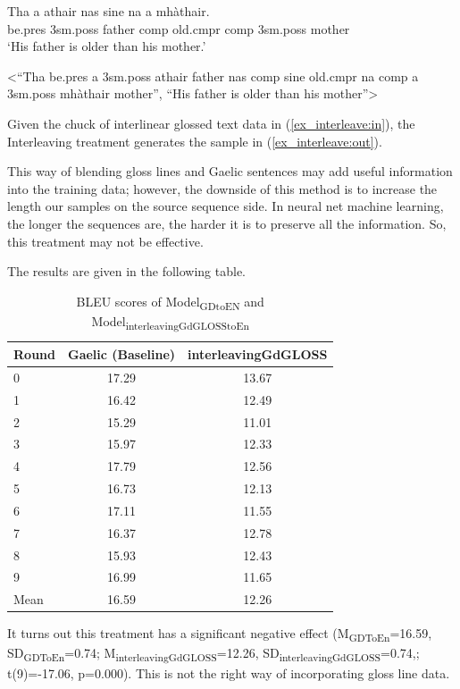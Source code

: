 \documentclass[final]{ua-thesis}
\numberwithin{equation}{section}
\begin{document}
\begin{exe} 
\ex 
	\begin{xlist}
	\ex \label{ex_interleave:in}
		\gll	 Tha a athair nas sine na a mh\`athair.\\  
     		     be.pres 3sm.poss father comp old.cmpr comp 3sm.poss mother \\
    	\glt    `His father is older than his mother.'  

    \ex \label{ex_interleave:out} <``Tha be.pres a 3sm.poss athair father nas comp sine old.cmpr na comp a 3sm.poss mh\`athair mother'', ``His father is older than his mother''>
    \end{xlist}
\end{exe}

Given the chuck of interlinear glossed text data in (\ref{ex_interleave:in}), the Interleaving treatment generates the sample in (\ref{ex_interleave:out}).  

This way of blending gloss lines and Gaelic sentences may add useful information into the training data; however, the downside of this method is to increase the length our samples on the source sequence side. In neural net machine learning, the longer the sequences are, the harder it is to preserve all the information. So, this treatment may not be effective. 


The results are given in the following table. 
\begin{table}[ht]
\centering
\begin{tabular}{lcc}
  \hline
Round & Gaelic (Baseline) & interleavingGdGLOSS \\ 
  \hline
0 & 17.29 & 13.67 \\ 
  1 & 16.42 & 12.49 \\ 
  2 & 15.29 & 11.01 \\ 
  3 & 15.97 & 12.33 \\ 
  4 & 17.79 & 12.56 \\ 
  5 & 16.73 & 12.13 \\ 
  6 & 17.11 & 11.55 \\ 
  7 & 16.37 & 12.78 \\ 
  8 & 15.93 & 12.43 \\ 
  9 & 16.99 & 11.65 \\ 
   \hline
Mean & 16.59 & 12.26 \\ 
   \hline
\end{tabular}
\caption{BLEU scores of Model\textsubscript{GDtoEN} and Model\textsubscript{interleavingGdGLOSStoEn}} 
\label{Table:interleavingGdGLOSS}
\end{table}\newline
It turns out this treatment has a significant negative effect
(M\textsubscript{GDToEn}=16.59, SD\textsubscript{GDToEn}=0.74; M\textsubscript{interleavingGdGLOSS}=12.26, SD\textsubscript{interleavingGdGLOSS}=0.74,; t(9)=-17.06, p=0.000). This is not the right way of incorporating gloss line data. 
\end{document}
